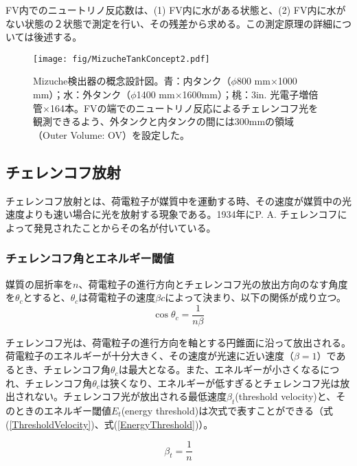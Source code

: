 \documentclass[11pt]{jreport}
\newcommand{\equref}[1]{式(\ref{#1})}
\begin{document}
FV内でのニュートリノ反応数は、(1) FV内に水がある状態と、(2) FV内に水がない状態の２状態で測定を行い、その残差から求める。この測定原理の詳細については後述する。

\begin{figure}[htb]
\centering
\texttt{[image: fig/MizucheTankConcept2.pdf]}
\caption[Mizuche検出器の概念設計図]{Mizuche検出器の概念設計図。青：内タンク（$\phi$800 mm$\times$1000 mm）；水：外タンク（$\phi$1400 mm$\times$1600mm）；桃：3in. 光電子増倍管$\times$164本。FVの端でのニュートリノ反応によるチェレンコフ光を観測できるよう、外タンクと内タンクの間には300mmの領域（Outer Volume: OV）を設定した。}
\label{TankConcept}
\end{figure}


\subsection{チェレンコフ放射}
チェレンコフ放射とは、荷電粒子が媒質中を運動する時、その速度が媒質中の光速度よりも速い場合に光を放射する現象である。1934年にP. A. チェレンコフによって発見されたことからその名が付いている。

\subsubsection{チェレンコフ角とエネルギー閾値}
媒質の屈折率を$n$、荷電粒子の進行方向とチェレンコフ光の放出方向のなす角度を$\theta_{c}$とすると、$\theta_{c}$は荷電粒子の速度$\beta c$によって決まり、以下の関係が成り立つ。%
\begin{equation}
\cos \theta_{c} = \frac{1}{n\beta}
\label{CherenkovAngle}
\end{equation}

チェレンコフ光は、荷電粒子の進行方向を軸とする円錐面に沿って放出される。荷電粒子のエネルギーが十分大きく、その速度が光速に近い速度（$\beta =1$）であるとき、チェレンコフ角$\theta_{c}$は最大となる。また、エネルギーが小さくなるにつれ、チェレンコフ角$\theta_{c}$は狭くなり、エネルギーが低すぎるとチェレンコフ光は放出されない。チェレンコフ光が放出される最低速度$\beta_{t}$(threshold velocity)と、そのときのエネルギー閾値$E_{t}$(energy threshold)は次式で表すことができる（\equref{ThresholdVelocity}、\equref{EnergyThreshold}）。

\begin{equation}
\beta_{t} = \frac{1}{n}
\label{ThresholdVelocity}
\end{equation}
\end{document}
